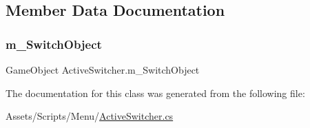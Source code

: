 \subsection{Member Data Documentation}
\mbox{\label{class_active_switcher_a8a51582a19c1bc16fc32f2b3bf86c8e1}} 
\subsubsection{\texorpdfstring{m\_SwitchObject}{m\_SwitchObject}}
{\footnotesize\ttfamily Game\+Object Active\+Switcher.\+m\+\_\+\+Switch\+Object}



The documentation for this class was generated from the following file\+:\begin{DoxyCompactItemize}
\item 
Assets/\+Scripts/\+Menu/\mbox{\hyperlink{_active_switcher_8cs}{Active\+Switcher.\+cs}}\end{DoxyCompactItemize}
